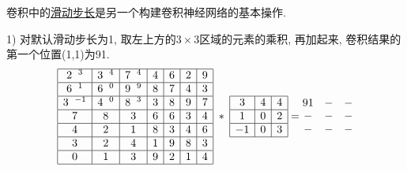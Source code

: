 \begin{example}
卷积中的\href{https://blog.csdn.net/weicao1990/article/details/80282837}{滑动步长}是另一个构建卷积神经网络的基本操作.

1) 对默认滑动步长为1, 取左上方的$3\times 3$区域的元素的乘积, 再加起来, 卷积结果的第一个位置(1,1)为91.
\begin{align*}
\begin{array}{|c|c|c|c|c|c|c|}
\hline 2\;\; ^{3} & 3\;\;^{4} & 7\;\;^{4} & 4 & 6 & 2 & 9 \\
\hline 6\;\;^{1} & 6\;\;^{0} & 9\;\;^{9} & 8 & 7 & 4 & 3 \\
\hline 3\;\;^{-1} & 4\;\;^{0} & 8\;\;^{3} & 3 & 8 & 9 & 7 \\
\hline 7 & 8 & 3 & 6 & 6 & 3 & 4 \\
\hline 4 & 2 & 1 & 8 & 3 & 4 & 6 \\
\hline 3 & 2 & 4 & 1 & 9 & 8 & 3 \\
\hline 0 & 1 & 3 & 9 & 2 & 1 & 4 \\
\hline
\end{array}
\;*\;
\begin{array}{|c|c|c|}
\hline 3 & 4 & 4 \\
\hline 1 & 0 & 2 \\
\hline-1 & 0 & 3 \\
\hline
\end{array}
=
\begin{matrix}
91 &-&- \\
-&- &- \\
-&- &-\\
\end{matrix}
\end{align*}


\end{example}
